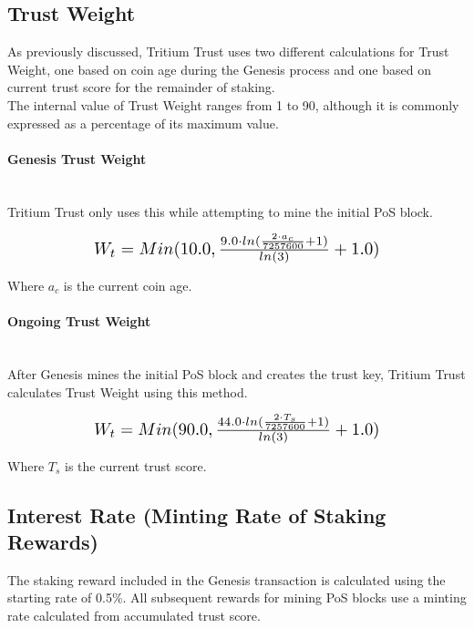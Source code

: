 \documentclass[11pt]{article}
\begin{document}
\subsection{Trust Weight}
\noindent As previously discussed, Tritium Trust uses two different calculations for Trust Weight, one based on coin age during the Genesis process and one based on current trust score for the remainder of staking.\\

\noindent The internal value of Trust Weight ranges from 1 to 90, although it is commonly expressed as a percentage of its maximum value.\\

\paragraph{Genesis Trust Weight} ~\\
Tritium Trust only uses this while attempting to mine the initial PoS block.

\begin{equation}
\resizebox{.65\hsize}{!}{$W_{t} = Min(10.0, \frac{9.0 \cdot ln(\frac{2 \cdot a_c}{7257600} + 1)}{ln(3)} + 1.0)$}
\end{equation}

\noindent Where $a_c$ is the current coin age.\\

\paragraph{Ongoing Trust Weight} ~\\
After Genesis mines the initial PoS block and creates the trust key, Tritium Trust calculates Trust Weight using this method.
 
\begin{equation}
\resizebox{.65\hsize}{!}{$W_{t} = Min(90.0, \frac{44.0 \cdot ln(\frac{2 \cdot T_{s}}{7257600} + 1)}{ln(3)} + 1.0)$}
\end{equation}

\noindent Where $T_{s}$ is the current trust score.\\


\subsection{Interest Rate (Minting Rate of Staking Rewards)}
\noindent The staking reward included in the Genesis transaction is calculated using the starting rate of 0.5\%. All subsequent rewards for mining PoS blocks use a minting rate calculated from accumulated trust score.\\
 
\end{document}
